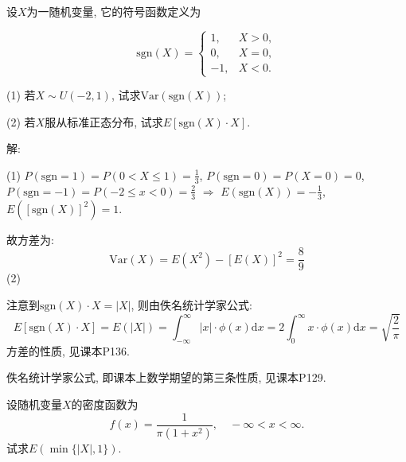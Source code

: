 \documentclass[standard]{ExBook}
\begin{document}
\begin{qitems}
\vspace{-5em}

    \begin{bbox}
    \begin{shaded}
        \qitem
设$X$为一随机变量, 它的符号函数定义为
\vspace{-2em}
\begin{center}
\begin{equation}
    \text{sgn}(X)=
    \left\{
\begin{array}{cl}
    \nonumber
1, &X>0,\\
0, &X=0,\\
-1, &X<0.
\end{array}
    \right.
\end{equation}
\end{center}
(1) 若$X\sim U(-2,1)$, 试求$\mathrm{Var}(\text{sgn}(X))$;

(2) 若$X$服从标准正态分布, 试求$E[\text{sgn}(X)\cdot X]$.
    \end{shaded}
    \end{bbox}

\vspace{-5em}

    \begin{bbox}
解: 

(1) $P(\text{sgn}=1)=P(0<X\leq1)=\displaystyle\frac{1}{3}$, $P(\text{sgn}=0)=P(X=0)=0$, $P(\text{sgn}=-1)=P(-2\leq x<0)=\displaystyle\frac{2}{3}$ $\Longrightarrow$ $E(\text{sgn}(X))=-\displaystyle\frac{1}{3}$, $E(\left[\text{sgn}(X)\right]^2)=1$.

故方差为:
$$\mathrm{Var}(X)=E(X^2)-\left[E(X)\right]^2=\frac{8}{9}$$
(2)

注意到$\text{sgn}(X)\cdot X=|X|$, 则由佚名统计学家公式:
$$E[\text{sgn}(X)\cdot X]=E(|X|)=\displaystyle\int_{-\infty}^{\infty}|x|\cdot\phi(x)\mathrm{d}x=2\int_{0}^{\infty}x\cdot\phi(x)\mathrm{d}x=\sqrt{\frac{2}{\pi}}$$
\textcolor{themeColor}{\selectfont {}
方差的性质, 见课本P136.}

\textcolor{themeColor}{\selectfont {} 佚名统计学家公式, 即课本上数学期望的第三条性质, 见课本P129.}
    \end{bbox}

\vspace{-5em}

    \begin{bbox}
    \begin{shaded}
        \qitem
设随机变量$ X $的密度函数为
$$f(x)=\displaystyle\frac{1}{\pi(1+x^2)},\quad -\infty<x<\infty.$$
试求$E(\min\{|X|,1\})$.
    \end{shaded}
    \end{bbox}


\end{qitems}
\end{document}
